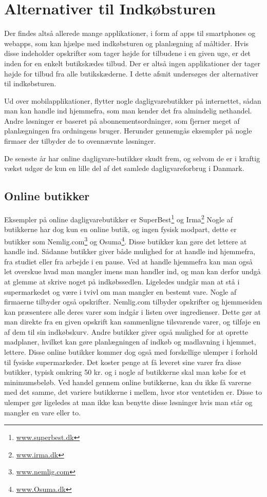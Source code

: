 \section{Alternativer til Indkøbsturen}
Der findes altså allerede mange applikationer, i form af apps til smartphones og webapps, som kan hjælpe med indkøbsturen og planlægning af måltider. Hvis disse indeholder opskrifter som tager højde for tilbudene i en given uge, er det inden for en enkelt butikskædes tilbud. Der er altså ingen applikationer der tager højde for tilbud fra alle butikskæderne. I dette afsnit undersøges der alternativer til indkøbsturen.

Ud over mobilapplikationer, flytter nogle dagligvarebutikker på internettet, sådan man kan handle ind hjemmefra, som man kender det fra almindelig nethandel.
Andre løsninger er baseret på abonnementsordninger, som fjerner meget af planlægningen fra ordningens bruger.
Herunder gennemgås eksempler på nogle firmaer der tilbyder de to ovennævnte løsninger.

De seneste år har online dagligvare-butikker skudt frem, og selvom de er i kraftig vækst udgør de kun en lille del af det samlede dagligvareforbrug i Danmark\citep{SOTA_MP1}.

\subsection{Online butikker}
Eksempler på online dagligvarebutikker er SuperBest\footnote{\underline{www.superbest.dk}} og Irma\footnote{\underline{www.irma.dk}}
Nogle af butikkerne har dog kun en online butik, og ingen fysisk modpart, dette er butikker som Nemlig.com\footnote{\underline{www.nemlig.com}} og Osuma\footnote{\underline{www.Osuma.dk}}.
Disse butikker kan gøre det lettere at handle ind.
Sådanne butikker giver både mulighed for at handle ind hjemmefra, fra studiet eller fra arbejde i en pause.
Ved at handle hjemmefra kan man også let overskue hvad man mangler imens man handler ind, og man kan derfor undgå at glemme at skrive noget på indkøbssedlen.
Ligeledes undgår man at stå i supermarkedet og være i tvivl om man mangler en bestemt vare.
Nogle af firmaerne tilbyder også opskrifter.
Nemlig.com tilbyder opskrifter og hjemmesiden kan præsentere alle deres varer som indgår i listen over ingredienser.
Dette gør at man direkte fra en given opskrift kan sammenligne tilsvarende varer, og tilføje en af dem til sin indkøbskurv.
Andre butikker giver også mulighed for at oprette madplaner, hvilket kan gøre planlægningen af indkøb og madlavning i hjemmet, lettere.
Disse online butikker kommer dog også med forskellige ulemper i forhold til fysiske supermarkeder.
Det koster penge at få leveret sine varer fra disse butikker, typisk omkring 50 kr. og i nogle af butikkerne skal man købe for et minimumsbeløb.
Ved handel gennem online butikkerne, kan du ikke få varerne med det samme, det variere butikkerne i mellem, hvor stor ventetiden er.
Disse to ulemper gør ligeledes at man ikke kan benytte disse løsninger hvis man står og mangler en vare eller to.


